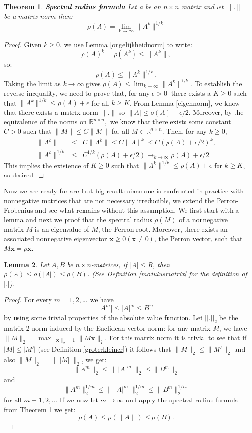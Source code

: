 \documentclass[a4paper,11pt]{report}
\newtheorem{theorem}{Theorem}[section]
\newtheorem{lemma}[theorem]{Lemma}
\newcommand{\R}{{\mathbb R}}
\begin{document}
\begin{theorem}\label{spectraalformula}\textbf{Spectral radius formula}
 Let a be an $n\times n$  matrix and  let $\|.\|$ be a matrix norm then:
  $$\rho(A) = \lim_{k\to \infty} \|A^k\|^{1/k}$$
\end{theorem}
\begin{proof}
  Given $k \geq 0$, we use Lemma \ref{ongelijkheidnorm} to write:
  $$\rho(A)^k = \rho(A^k) \leq \|A^k\|,$$
  so:
  $$\rho(A) \leq \|A^k\|^{1/k}.$$
  Taking the limit as $k \to \infty$ gives $\rho(A) \leq \lim_{k\to 
  \infty}\|A^k\|^{1/k}$. To establish the reverse inequality, we need to prove 
  that, for any $\epsilon > 0$, there exists a $K \geq 0$ such that 
  $\|A^k\|^{1/k} \leq \rho(A) + \epsilon$ for all $k \geq K$. From Lemma \ref{eigennorm}, we know that
  there exists a matrix norm $\|.\|$ so $\|A| \leq \rho(A) + \epsilon/2$. Moreover, by the equivalence of 
  the norms on $\R^{n\times n},$ we know that there exists some constant $C  > 0$ such that 
  $\|M\| \leq C \|M\|$ for all $M \in \R^{n \times n}$. Then, for any $k \geq 0,$
  \begin{eqnarray*}
    \|A^k\| &\leq& C\|A^k\| \leq C\|A\|^k \leq C(\rho(A)+\epsilon/2)^k,\\
    \|A^k\|^{1/k} &\leq& C^{1/k}(\rho(A)+\epsilon/2) \rightarrow_{k\to \infty} 
    \rho(A) + \epsilon/2
  \end{eqnarray*}
  This implies the existence of $K \geq 0$ such that $\|A^k\|^{1/k} \leq \rho(A) + \epsilon$ 
  for $k \geq K$, as desired.
 \end{proof}
Now we are ready for are first big result: since one is confronted in practice 
with nonnegative matrices that are not necessary irreducible, 
we extend the Perron-Frobenius and see what remains without this assumption. We 
first start with a lemma and next we proof that the spectral radius $\rho(M)$ of a nonnegative matrix 
$M$ is an eigenvalue of $M$, the Perron root. Moreover, there exists an 
associated nonnegative eigenvector $\mathbf{x} \geq 0 (\mathbf{x} \not = 0)$, the Perron vector, such 
that $M\mathbf{x} = \rho\mathbf{x}$.
\begin{lemma}\label{voriglemmaspeer}
  Let $A, B$ be $n \times n$-matrices, if $|A| \leq B$, then $\rho(A) \leq \rho(|A|) \leq
  \rho(B)$. (See Definition \ref{modulusmatrix} for the definition of $|.|$).
\end{lemma}
\begin{proof}
  For every $m=1,2,\ldots$ we have
  $$|A^m| \leq |A|^m \leq B^m$$
  by using some trivial properties of the absolute value function. Let $||.||_2$ be the matrix 
  2-norm induced by the Euclidean vector norm: for any matrix $M$, we have $\|M\|_2 =
  \max_{\|\mathbf{x}\|_2 = 1}\|M\mathbf{x}\|_2$. For this matrix norm it is 
  trivial to see that if $|M| \leq |M'|$ (see Definition \ref{groterkleiner}) it follows that $\|M\|_2 \leq \|M'\|_2$ and also $\|M\|_2 = \|\;|M|\;\|_2$, we get:
  $$\|A^m\|_2 \leq \|\;|A|^m\;\|_2 \leq \|B^m\|_2$$
  and 
  $$\|A^m\|^{1/m}_2 \leq \|\;|A|^m\;\|^{1/m}_2 \leq \|B^m\|^{1/m}_2$$
  for all $m = 1, 2, \ldots$ If we now let $m \to \infty$ and apply the spectral 
  radius formula from Theorem \ref{spectraalformula} we get:
  $$\rho(A) \leq \rho(\|A\|) \leq \rho(B).$$
\end{proof}
\end{document}
